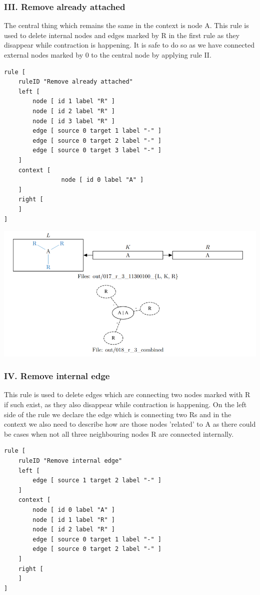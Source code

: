 \documentclass[a4paper,10pt,titlepage]{report}
\begin{document}
\subsubsection{III. Remove already attached}

The central thing which remains the same in the context is node A. This rule is used to delete internal nodes and edges marked by R in the first rule as they disappear while contraction is happening. It is safe to do so as we have connected external nodes marked by 0 to the central node by applying rule II. 

\begin{lstlisting}
rule [
	ruleID "Remove already attached"
	left [
		node [ id 1 label "R" ]
		node [ id 2 label "R" ]
		node [ id 3 label "R" ]
		edge [ source 0 target 1 label "-" ]
		edge [ source 0 target 2 label "-" ]
		edge [ source 0 target 3 label "-" ]
	]
	context [
                node [ id 0 label "A" ]
	]
	right [
	]
]
\end{lstlisting}

\vspace{10mm}
\includegraphics[scale=0.7]{iii.png}
\vspace{10mm}

\subsubsection{IV. Remove internal edge}

This rule is used to delete edges which are connecting two nodes marked with R if such exist, as they also disappear while contraction is happening. On the left side of the rule we declare the edge which is connecting two Rs and in the context we also need to describe how are those nodes 'related' to A as there could be cases when not all three neighbouring nodes R are connected internally.

\begin{lstlisting}
rule [
	ruleID "Remove internal edge"
	left [
		edge [ source 1 target 2 label "-" ]
	]
	context [
		node [ id 0 label "A" ]
		node [ id 1 label "R" ]
		node [ id 2 label "R" ]
		edge [ source 0 target 1 label "-" ]
		edge [ source 0 target 2 label "-" ]
	]
	right [
	]
]
\end{lstlisting}
\end{document}
